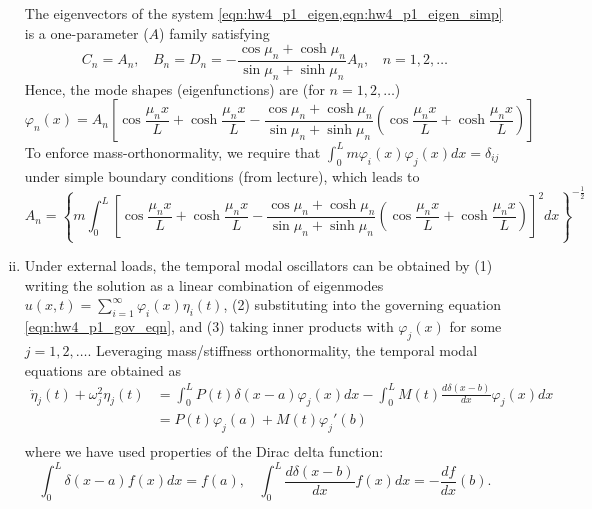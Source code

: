\begin{enumerate}[(i)]
{    The eigenvectors of the system \cref{eqn:hw4_p1_eigen,eqn:hw4_p1_eigen_simp} is a one-parameter ($A$) family satisfying
    \begin{equation}
        C_n = A_n, ~~~~ B_n = D_n = -\frac{\cos\mu_n + \cosh\mu_n}{\sin\mu_n + \sinh\mu_n} A_n, ~~~~ n = 1, 2, \ldots
    \end{equation}
    Hence, the mode shapes (eigenfunctions) are (for $n = 1, 2, \ldots$) 
    \begin{equation}\label{eqn:hw4_p1_spatial_soln}
        \boxed{\varphi_n(x) = A_n \left[\cos\frac{\mu_n x}{L} + \cosh\frac{\mu_n x}{L} - \frac{\cos\mu_n + \cosh\mu_n}{\sin\mu_n + \sinh\mu_n} \left(\cos\frac{\mu_n x}{L} + \cosh\frac{\mu_n x}{L}\right) \right]}
    \end{equation}
    To enforce mass-orthonormality, we require that $\int_0^L m \varphi_i(x) \varphi_j(x) dx = \delta_{ij}$ under simple boundary conditions (from lecture), which leads to 
    \begin{equation}\label{eqn:hw4_p1_coeff}
        \boxed{A_n = {\left\{ m \int_0^L {\left[\cos\frac{\mu_n x}{L} + \cosh\frac{\mu_n x}{L} - \frac{\cos\mu_n + \cosh\mu_n}{\sin\mu_n + \sinh\mu_n} \left(\cos\frac{\mu_n x}{L} + \cosh\frac{\mu_n x}{L}\right) \right]}^2 dx \right\}}^{-\frac{1}{2}}}
    \end{equation}
}
\item { %
    Under external loads, the temporal modal oscillators can be obtained by (1) writing the solution as a linear combination of eigenmodes $u(x, t) = \sum_{i=1}^\infty \varphi_i(x)\eta_i(t)$, (2) substituting into the governing equation \cref{eqn:hw4_p1_gov_eqn}, and (3) taking inner products with $\varphi_j(x)$ for some $j = 1, 2, \ldots$. 
    Leveraging mass/stiffness orthonormality, the temporal modal equations are obtained as 
    \begin{equation}\label{eqn:hw4_p1_temporal_eqn}
    \begin{aligned}
        \ddot{\eta}_j(t) + \omega_j^2 \eta_j(t) &= \int_0^L P(t) \delta(x - a) \varphi_j(x) dx - \int_0^L M(t) \frac{d\delta(x - b)}{dx} \varphi_j(x) dx \\
        &= P(t) \varphi_j(a) + M(t) \varphi_j'(b) \\ 
    \end{aligned}
    \end{equation}
    where we have used properties of the Dirac delta function:
    \begin{equation}
        \int_0^L \delta(x - a) f(x) dx = f(a), ~~~~ \int_0^L \frac{d\delta(x - b)}{dx} f(x) dx = -\frac{df}{dx}(b).

\end{equation}}
\end{enumerate}
